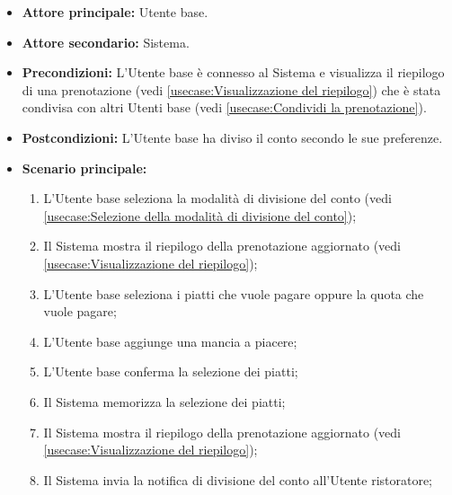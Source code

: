 \label{usecase:Divisione del conto}
\begin{itemize}
	\item \textbf{Attore principale:} Utente base.

	\item \textbf{Attore secondario:} Sistema.

	\item \textbf{Precondizioni:} L'Utente base è connesso al Sistema e
	      visualizza il riepilogo di una prenotazione
	      (vedi \autoref{usecase:Visualizzazione del riepilogo}) che è stata
	      condivisa con altri Utenti base
	      (vedi \autoref{usecase:Condividi la prenotazione}).

	\item \textbf{Postcondizioni:} L'Utente base ha diviso il conto secondo le
	      sue preferenze.

	\item \textbf{Scenario principale:}
	      \begin{enumerate}
		      \item L'Utente base seleziona la modalità di divisione del conto
		            (vedi \autoref{usecase:Selezione della modalità di divisione del conto});

		      \item Il Sistema mostra il riepilogo della prenotazione aggiornato
		            (vedi \autoref{usecase:Visualizzazione del riepilogo});

		      \item L'Utente base seleziona i piatti che vuole pagare oppure la
		            quota che vuole pagare;

		      \item L'Utente base aggiunge una mancia a piacere;

		      \item L'Utente base conferma la selezione dei piatti;

		      \item Il Sistema memorizza la selezione dei piatti;

		      \item Il Sistema mostra il riepilogo della prenotazione aggiornato
		            (vedi \autoref{usecase:Visualizzazione del riepilogo});

		      \item Il Sistema invia la notifica di divisione del conto
		            all'Utente ristoratore;
	      \end{enumerate}
\end{itemize}

